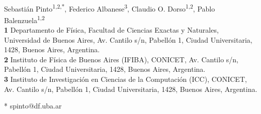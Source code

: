 \documentclass[10pt,letterpaper]{article}
\begin{document}
\vspace*{0.2in}

\begin{flushleft}
{\Large
\textbf{} %
}
\newline
\\
Sebasti\'an Pinto\textsuperscript{1,2,*},
Federico Albanese\textsuperscript{3},
Claudio O. Dorso\textsuperscript{1,2},
Pablo Balenzuela\textsuperscript{1,2}
\\
\bigskip
\textbf{1} Departamento de F\'isica, Facultad de Ciencias Exactas y Naturales, Universidad de Buenos Aires, Av. Cantilo s/n, Pabell\'on 1, Ciudad Universitaria, 1428, Buenos Aires, Argentina.
\\
\textbf{2} Instituto de F\'isica de Buenos Aires (IFIBA), CONICET, Av. Cantilo s/n, Pabell\'on 1, Ciudad Universitaria, 1428, Buenos Aires, Argentina.
\\
\textbf{3} Instituto de Investigaci\'on en Ciencias de la Computaci\'on (ICC), CONICET, Av. Cantilo s/n, Pabell\'on 1, Ciudad Universitaria, 1428, Buenos Aires, Argentina.
\\
\bigskip

% 
%





* spinto@df.uba.ar

\end{flushleft}
\end{document}
